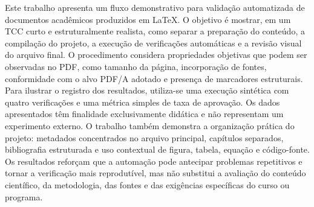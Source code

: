 Este trabalho apresenta um fluxo demonstrativo para validação automatizada de documentos acadêmicos produzidos em LaTeX. O objetivo é mostrar, em um TCC curto e estruturalmente realista, como separar a preparação do conteúdo, a compilação do projeto, a execução de verificações automáticas e a revisão visual do arquivo final. O procedimento considera propriedades objetivas que podem ser observadas no PDF, como tamanho da página, incorporação de fontes, conformidade com o alvo PDF/A adotado e presença de marcadores estruturais. Para ilustrar o registro dos resultados, utiliza-se uma execução sintética com quatro verificações e uma métrica simples de taxa de aprovação. Os dados apresentados têm finalidade exclusivamente didática e não representam um experimento externo. O trabalho também demonstra a organização prática do projeto: metadados concentrados no arquivo principal, capítulos separados, bibliografia estruturada e uso contextual de figura, tabela, equação e código-fonte. Os resultados reforçam que a automação pode antecipar problemas repetitivos e tornar a verificação mais reprodutível, mas não substitui a avaliação do conteúdo científico, da metodologia, das fontes e das exigências específicas do curso ou programa.

